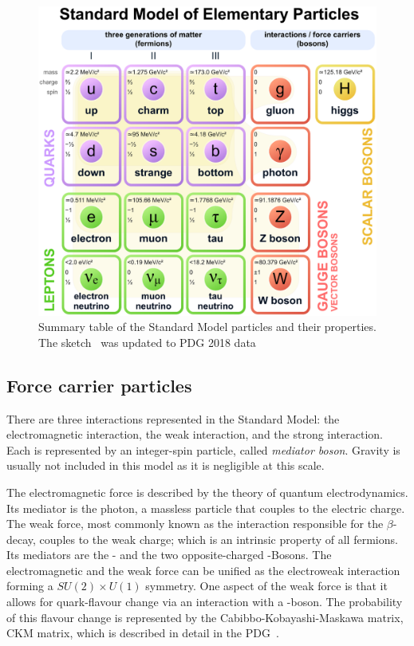 \begin{figure}
	\centering
	\includegraphics[width=\textwidth]{figures_SM/standard_model.eps}
	\caption[Standard Model particles]{Summary table of the Standard Model particles and their properties. The sketch~\cite{standard_model} was updated to PDG 2018 data~\cite{PDG}}
	\label{fig:sm}
\end{figure}



\subsection{Force carrier particles}

There are three interactions represented in the Standard Model: the electromagnetic interaction, the weak interaction, and the strong interaction. Each is represented by an integer-spin particle, called \emph{mediator boson}. Gravity is usually not included in this model as it is negligible at this scale. 

The electromagnetic force is described by the theory of quantum electrodynamics. Its mediator is the photon, a massless particle that couples to the electric charge.
The weak force, most commonly known as the interaction responsible for the $\beta$-decay, couples to the weak charge; which is an intrinsic property of all fermions. Its mediators are the \PZ- and the two opposite-charged \PW-Bosons.
The electromagnetic and the weak force can be unified as the electroweak interaction forming a $SU(2) \times U(1)$ symmetry.
One aspect of the weak force is that it allows for quark-flavour change via an interaction with a \PW-boson. The probability of this flavour change is represented by the Cabibbo-Kobayashi-Maskawa matrix, CKM matrix, which is described in detail in the PDG~\cite{PDG}.

